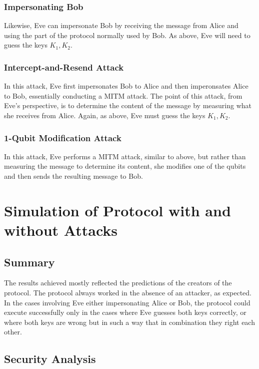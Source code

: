\documentclass[conference]{IEEEtran}
\begin{document}
\subsubsection{Impersonating Bob}

Likewise, Eve can impersonate Bob by receiving the message from Alice
and using the part of the protocol normally used by Bob. As above,
Eve will need to guess the keys $K_{1},K_{2}$.

\subsubsection{Intercept-and-Resend Attack}

In this attack, Eve first impersonates Bob to Alice and then imperonsates
Alice to Bob, essentially conducting a MITM attack. The point of this
attack, from Eve's perspective, is to determine the content of the
message by measuring what she receives from Alice. Again, as above,
Eve must guess the keys $K_{1},K_{2}$.

\subsubsection{1-Qubit Modification Attack}

In this attack, Eve performs a MITM attack, similar to above, but
rather than measuring the message to determine its content, she modifies
one of the qubits and then sends the resulting message to Bob.

\section{Simulation of Protocol with and without Attacks}

\subsection{Summary}

The results achieved mostly reflected the predictions of the creators
of the protocol. The protocol always worked in the absence of an attacker,
as expected. In the cases involving Eve either impersonating Alice
or Bob, the protocol could execute successfully only in the cases
where Eve guesses both keys correctly, or where both keys are wrong
but in such a way that in combination they right each other.

\subsection{Security Analysis}
\end{document}

